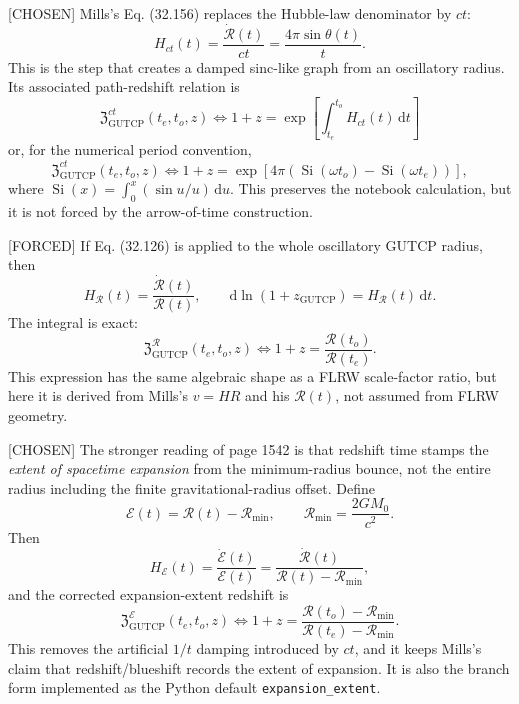 \documentclass[11pt]{article}
\newcommand{\dd}{\mathrm{d}}
\newcommand{\zG}{z_{\mathrm{GUTCP}}}
\newcommand{\RG}{\mathcal{R}}
\newcommand{\EG}{\mathcal{E}}
\newcommand{\ZRel}{\mathfrak{Z}_{\mathrm{GUTCP}}}
\begin{document}
[CHOSEN] Mills's Eq. (32.156) replaces the Hubble-law denominator by \(ct\):
\begin{equation}
H_{ct}(t)=\frac{\dot{\RG}(t)}{ct}
=\frac{4\pi\sin\theta(t)}{t}.
\label{eq:h-ct}
\end{equation}
This is the step that creates a damped sinc-like graph from an oscillatory
radius.  Its associated path-redshift relation is
\begin{equation}
\boxed{
\ZRel^{ct}(t_e,t_o,z)
\Longleftrightarrow
1+z
=
\exp\!\left[
\int_{t_e}^{t_o} H_{ct}(t)\,\dd t
\right]
}
\label{eq:zgutcp-ct}
\end{equation}
or, for the numerical period convention,
\begin{equation}
\boxed{
\ZRel^{ct}(t_e,t_o,z)
\Longleftrightarrow
1+z
=
\exp\!\left[
4\pi\left(\operatorname{Si}(\omega t_o)
-\operatorname{Si}(\omega t_e)\right)
\right],
}
\label{eq:zgutcp-ct-si}
\end{equation}
where \(\operatorname{Si}(x)=\int_0^x(\sin u/u)\,\dd u\).  This preserves the
notebook calculation, but it is not forced by the arrow-of-time construction.

[FORCED] If Eq. (32.126) is applied to the whole oscillatory GUTCP radius, then
\[
H_{\RG}(t)=\frac{\dot{\RG}(t)}{\RG(t)},\qquad
\dd\ln(1+\zG)=H_{\RG}(t)\,\dd t.
\]
The integral is exact:
\begin{equation}
\boxed{
\ZRel^{\RG}(t_e,t_o,z)
\Longleftrightarrow
1+z=\frac{\RG(t_o)}{\RG(t_e)}.
}
\label{eq:zgutcp-radius}
\end{equation}
This expression has the same algebraic shape as a FLRW scale-factor ratio, but
here it is derived from Mills's \(v=HR\) and his \(\RG(t)\), not assumed from
FLRW geometry.

[CHOSEN] The stronger reading of page 1542 is that redshift time stamps the
\emph{extent of spacetime expansion} from the minimum-radius bounce, not the
entire radius including the finite gravitational-radius offset.  Define
\begin{equation}
\EG(t)=\RG(t)-\RG_{\min},\qquad
\RG_{\min}=\frac{2GM_0}{c^2}.
\end{equation}
Then
\[
H_{\EG}(t)=\frac{\dot{\EG}(t)}{\EG(t)}
=\frac{\dot{\RG}(t)}{\RG(t)-\RG_{\min}},
\]
and the corrected expansion-extent redshift is
\begin{equation}
\boxed{
\ZRel^{\EG}(t_e,t_o,z)
\Longleftrightarrow
1+z=
\frac{\RG(t_o)-\RG_{\min}}{\RG(t_e)-\RG_{\min}}.
}
\label{eq:zgutcp-extent}
\end{equation}
This removes the artificial \(1/t\) damping introduced by \(ct\), and it keeps
Mills's claim that redshift/blueshift records the extent of expansion.  It is
also the branch form implemented as the Python default
\texttt{expansion\_extent}.
\end{document}
